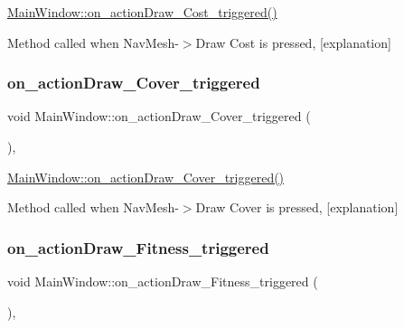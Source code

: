 \hyperlink{class_main_window_a01e3738d5bea469303149a2764d3acc6}{Main\+Window\+::on\+\_\+action\+Draw\+\_\+\+Cost\+\_\+triggered()} 

Method called when Nav\+Mesh-\/$>$Draw Cost is pressed, \mbox{[}explanation\mbox{]} \mbox{\label{class_main_window_a95505aa506e45dc84d8890778ad64212}} 
\subsubsection{\texorpdfstring{on\+\_\+action\+Draw\+\_\+\+Cover\+\_\+triggered}{on\_actionDraw\_Cover\_triggered}}
{\footnotesize\ttfamily void Main\+Window\+::on\+\_\+action\+Draw\+\_\+\+Cover\+\_\+triggered (\begin{DoxyParamCaption}{ }\end{DoxyParamCaption})\hspace{0.3cm}{\ttfamily [private]}, {\ttfamily [slot]}}



\hyperlink{class_main_window_a95505aa506e45dc84d8890778ad64212}{Main\+Window\+::on\+\_\+action\+Draw\+\_\+\+Cover\+\_\+triggered()} 

Method called when Nav\+Mesh-\/$>$Draw Cover is pressed, \mbox{[}explanation\mbox{]} \mbox{\label{class_main_window_a52e0431a7a166f48f8297a05eb42865d}} 
\subsubsection{\texorpdfstring{on\+\_\+action\+Draw\+\_\+\+Fitness\+\_\+triggered}{on\_actionDraw\_Fitness\_triggered}}
{\footnotesize\ttfamily void Main\+Window\+::on\+\_\+action\+Draw\+\_\+\+Fitness\+\_\+triggered (\begin{DoxyParamCaption}{ }\end{DoxyParamCaption})\hspace{0.3cm}{\ttfamily [private]}, {\ttfamily [slot]}}



